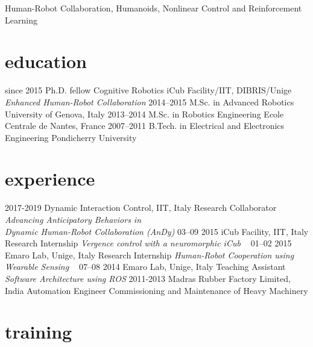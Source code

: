 \documentclass[]{friggeri-cv}
\begin{document}
Human-Robot Collaboration, Humanoids, Nonlinear Control and Reinforcement Learning

\section{education}

\begin{entrylist}
  \entry
    {since 2015}
    {Ph.D. {\normalfont fellow Cognitive Robotics}}
    {iCub Facility/IIT, DIBRIS/Unige}
    {\emph{Enhanced Human-Robot Collaboration}}
  \entry
    {2014–2015}
    {M.Sc. in Advanced Robotics}
    {University of Genova, Italy}
    {}
  \entry
    {2013–2014}
    {M.Sc. in Robotics Engineering}
    {Ecole Centrale de Nantes, France}
    {}
  \entry
    {2007–2011}
    {B.Tech. in Electrical and Electronics Engineering}
    {Pondicherry University}
    {}
\end{entrylist}

\vspace{-0.35cm}

\section{experience}

\begin{entrylist}
  \entry
    {2017-2019}
    {Dynamic Interaction Control, IIT, Italy}
    {Research Collaborator}
    {\emph{\small Advancing Anticipatory Behaviors in \\ Dynamic Human-Robot Collaboration (AnDy)\footnotemark}}
  \entry
    {03–09 2015}
    {iCub Facility, IIT, Italy}
    {Research Internship}
    {\emph{Vergence control with a neuromorphic iCub ~\cite{7803355}}}
  \entry
    {01–02 2015}
    {Emaro Lab, Unige, Italy}
    {Research Internship}
    {\emph{Human-Robot Cooperation using Wearable Sensing ~\cite{tirupachurihuman}}}
  \entry
    {07–08 2014}
    {Emaro Lab, Unige, Italy}
    {Teaching Assistant}
    {\emph{Software Architecture using ROS}}
  \entry
    {2011-2013}
    {Madras Rubber Factory Limited, India}
    {Automation Engineer}
    {Commissioning and Maintenance of Heavy Machinery}
\end{entrylist}


\vspace{-0.35cm}

\section{training}
\end{document}
